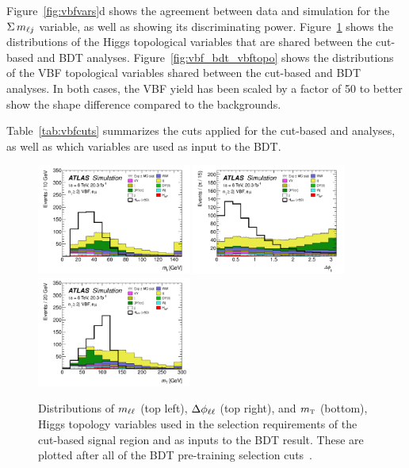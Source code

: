 Figure~\ref{fig:vbfvars}d shows the agreement between data and simulation for the $\Sigma\,m_{\ell j}$ variable, as well as showing its discriminating power. Figure~\ref{fig:vbf_bdt_htopo} shows the distributions of the Higgs topological variables that are shared between the cut-based and BDT analyses. Figure~\ref{fig:vbf_bdt_vbftopo} shows the distributions of the VBF topological variables shared between the cut-based and BDT analyses. In both cases, the VBF yield has been scaled by a factor of 50 to better show the shape difference compared to the backgrounds. 

Table~\ref{tab:vbfcuts} summarizes the cuts applied for the cut-based and analyses, as well as which variables are used as input to the BDT. 

\begin{figure}[h!]
  \centering
  \captionsetup{justification=centering}
  \includegraphics[width=0.45\textwidth]{figures/BDT_mll}
  \includegraphics[width=0.45\textwidth]{figures/BDT_dphill}
  \includegraphics[width=0.45\textwidth]{figures/BDT_mT}

  \caption{Distributions of $m_{\ell\ell}$ (top left), $\Delta\phi_{\ell\ell}$ (top right), and $m_{\textrm{\footnotesize\sc t}}$ (bottom), Higgs topology variables used in the selection requirements of the cut-based signal region and as inputs to the BDT result. These are plotted after all of the BDT pre-training selection cuts~\cite{WW2015}.}
  \label{fig:vbf_bdt_htopo}
\end{figure}

